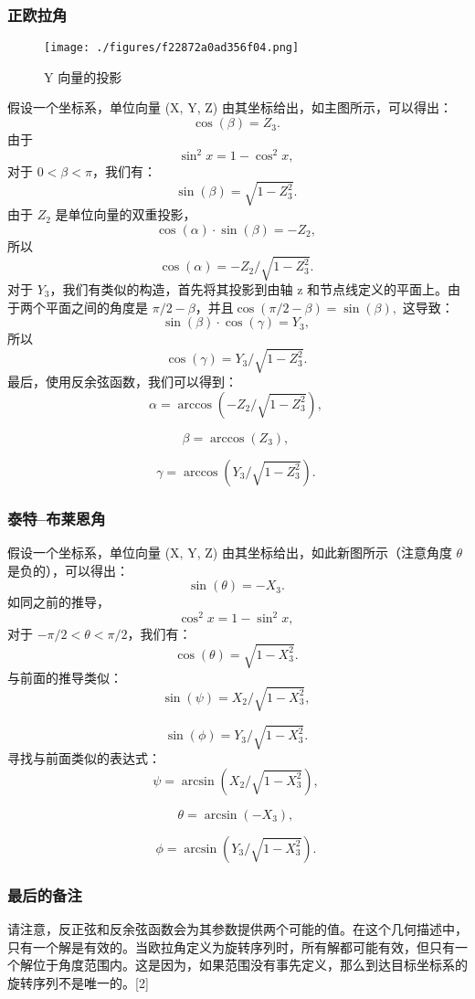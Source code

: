 \subsubsection{正欧拉角}
\begin{figure}[ht]
\centering
\texttt{[image: ./figures/f22872a0ad356f04.png]}
\caption{Y 向量的投影} \label{fig_OLJ_10}
\end{figure}
假设一个坐标系，单位向量 (X, Y, Z) 由其坐标给出，如主图所示，可以得出：
\[
\cos(\beta) = Z_3.~
\]
由于
\[
\sin^2 x = 1 - \cos^2 x,~
\]
对于 \( 0 < \beta < \pi \)，我们有：
\[
\sin(\beta) = \sqrt{1 - Z_3^2}.~
\]
由于 \( Z_2 \) 是单位向量的双重投影，
\[
\cos(\alpha) \cdot \sin(\beta) = -Z_2,~
\]
所以
\[
\cos(\alpha) = -Z_2/\sqrt{1 - Z_3^2}.~
\]
对于 \( Y_3 \)，我们有类似的构造，首先将其投影到由轴 z 和节点线定义的平面上。由于两个平面之间的角度是 \( \pi/2 - \beta \)，并且\(\cos\left(\pi/2 - \beta\right) = \sin(\beta),\)
这导致：
\[
\sin(\beta) \cdot \cos(\gamma) = Y_3,~
\]
所以
\[
\cos(\gamma) = Y_3/\sqrt{1 - Z_3^2}.~
\]
最后，使用反余弦函数，我们可以得到：
\[
\alpha = \arccos\left(-Z_2/\sqrt{1 - Z_3^2}\right),~
\]

\[
\beta = \arccos(Z_3),~
\]

\[
\gamma = \arccos\left(Y_3/\sqrt{1 - Z_3^2}\right).~
\]
\subsubsection{泰特–布莱恩角}
假设一个坐标系，单位向量 (X, Y, Z) 由其坐标给出，如此新图所示（注意角度 \( \theta \) 是负的），可以得出：
\[
\sin(\theta) = -X_3.~
\]
如同之前的推导，
\[
\cos^2 x = 1 - \sin^2 x,~
\]
对于 \( -\pi/2 < \theta < \pi/2 \)，我们有：
\[
\cos(\theta) = \sqrt{1 - X_3^2}.~
\]
与前面的推导类似：
\[
\sin(\psi) = X_2/\sqrt{1 - X_3^2},~
\]

\[
\sin(\phi) = Y_3/\sqrt{1 - X_3^2}.~
\]
寻找与前面类似的表达式：
\[
\psi = \arcsin\left(X_2/\sqrt{1 - X_3^2}\right),~
\]

\[
\theta = \arcsin(-X_3),~
\]

\[
\phi = \arcsin\left(Y_3/\sqrt{1 - X_3^2}\right).~
\]
\subsubsection{最后的备注}  
请注意，反正弦和反余弦函数会为其参数提供两个可能的值。在这个几何描述中，只有一个解是有效的。当欧拉角定义为旋转序列时，所有解都可能有效，但只有一个解位于角度范围内。这是因为，如果范围没有事先定义，那么到达目标坐标系的旋转序列不是唯一的。[2]

